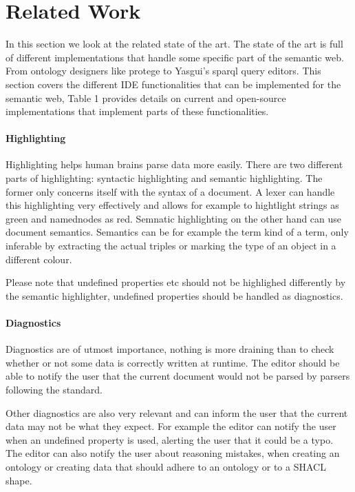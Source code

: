 \section{Related Work}%
\label{sec:related_work}

In this section we look at the related state of the art.
The state of the art is full of different implementations that handle some specific part of the semantic web.
From ontology designers like protege to Yasgui's sparql query editors.
This section covers the different IDE functionalities that can be implemented for the semantic web, Table 1 provides details on current and open-source implementations that implement parts of these functionalities.

\paragraph*{Highlighting}

Highlighting helps human brains parse data more easily.
There are two different parts of highlighting: syntactic highlighting and semantic highlighting.
The former only concerns itself with the syntax of a document. A lexer can handle this highlighting very effectively and allows for example to hightlight strings as green and namednodes as red.
Semnatic highlighting on the other hand can use document semantics. Semantics can be for example the term kind of a term, only inferable by extracting the actual triples or marking the type of an object in a different colour.

Please note that undefined properties etc should not be highlighed differently by the semantic highlighter, undefined properties should be handled as diagnostics.


\paragraph*{Diagnostics}

Diagnostics are of utmost importance, nothing is more draining than to check whether or not some data is correctly written at runtime.
The editor should be able to notify the user that the current document would not be parsed by parsers following the standard.

Other diagnostics are also very relevant and can inform the user that the current data may not be what they expect.
For example the editor can notify the user when an undefined property is used, alerting the user that it could be a typo.
The editor can also notify the user about reasoning mistakes, when creating an ontology or creating data that should adhere to an ontology or to a SHACL shape.


